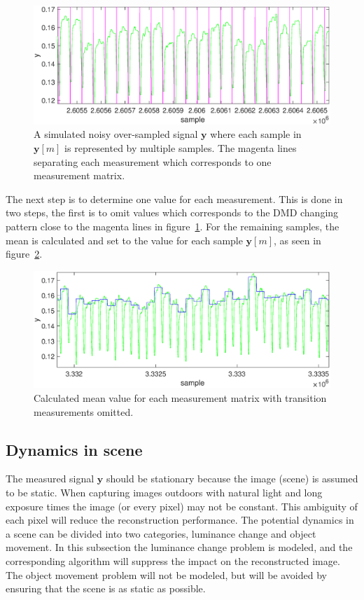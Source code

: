 \begin{figure}[H]
\includegraphics[width = 1\linewidth]{gfx/signal_proc/isolated_raw_signal.eps}
\caption{A simulated noisy over-sampled signal $\mathbf{y}$ where each sample in $\mathbf{y}[m]$ is represented by multiple samples. The magenta lines separating each measurement which corresponds to one measurement matrix.}
	\label{fig:raw_signal}
\end{figure}

The next step is to determine one value for each measurement. This is done in two steps, the first is to omit values which corresponds to the DMD changing pattern close to the magenta lines in figure~\ref{fig:raw_signal}. For the remaining samples, the mean is calculated and set to the value for each sample $\mathbf{y}[m]$, as seen in figure~\ref{fig:detarmain_signal}. 

\begin{figure}[H]
\includegraphics[width = 1\linewidth]{gfx/signal_proc/isolated_final_signal.eps}
\caption{Calculated mean value for each measurement matrix with transition measurements omitted.}
	\label{fig:detarmain_signal}
\end{figure}



\subsection{Dynamics in scene} %
\label{sec:Dynamics_in_scene}
The measured signal $\mathbf{y}$ should be stationary because the image (scene) is assumed to be static. When capturing images outdoors with natural light and long exposure times the image (or every pixel) may not be constant. This ambiguity of each pixel will reduce the reconstruction performance. The potential dynamics in a scene can be divided into two categories, luminance change and object movement. In this subsection the luminance change problem is modeled, and the corresponding algorithm will suppress the impact on the reconstructed image. The object movement problem will not be modeled, but will be avoided by ensuring that the scene is as static as possible.\\[0.1in] 


